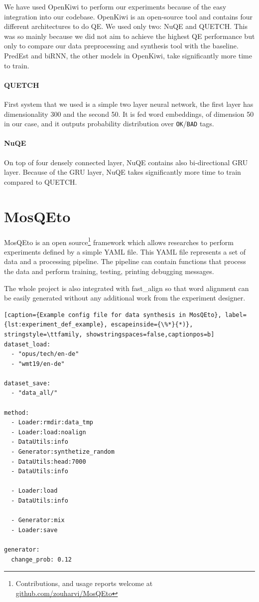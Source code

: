 \documentclass[12pt]{article}
\begin{document}
We have used OpenKiwi to perform our experiments because of the easy integration into our codebase. OpenKiwi is an open-source tool and contains four different architectures to do QE. We used only two: NuQE and QUETCH. This was so mainly because we did not aim to achieve the highest QE performance but only to compare our data preprocessing and synthesis tool with the baseline. PredEst and biRNN, the other models in OpenKiwi, take significantly more time to train.


\paragraph{QUETCH} First system that we used is a simple two layer neural network, the first layer has dimensionality 300 and the second 50.
It is fed word embeddings, of dimension 50 in our case, and it outputs probability distribution over \texttt{OK}/\texttt{BAD} tags.

\paragraph{NuQE} On top of four densely connected layer, NuQE contains also bi-directional GRU layer.
Because of the GRU layer, NuQE takes significantly more time to train compared to QUETCH.

\pagebreak

\section{MosQEto}
MosQEto is an open source\footnote{Contributions, and usage reports welcome at  \href{https://github.com/zouharvi/MosQEto}{github.com/zouharvi/MosQEto}} framework which allows researches to perform experiments defined by a simple YAML file. This YAML file represents a set of data and a processing pipeline. The pipeline can contain functions that process the data and perform training, testing, printing debugging messages.

The whole project is also integrated with fast\_align \cite{fastalign:2013} so that word alignment can be easily generated without any additional work from the experiment designer.

\begin{lstlisting}[caption={Example config file for data synthesis in MosQEto}, label={lst:experiment_def_example}, escapeinside={\%*}{*)}, stringstyle=\ttfamily, showstringspaces=false,captionpos=b]
dataset_load:
  - "opus/tech/en-de"
  - "wmt19/en-de"

dataset_save: 
  - "data_all/"
  
method:
  - Loader:rmdir:data_tmp
  - Loader:load:noalign
  - DataUtils:info
  - Generator:synthetize_random
  - DataUtils:head:7000
  - DataUtils:info
  
  - Loader:load
  - DataUtils:info
  
  - Generator:mix
  - Loader:save
  
generator:
  change_prob: 0.12
\end{lstlisting}
\end{document}
